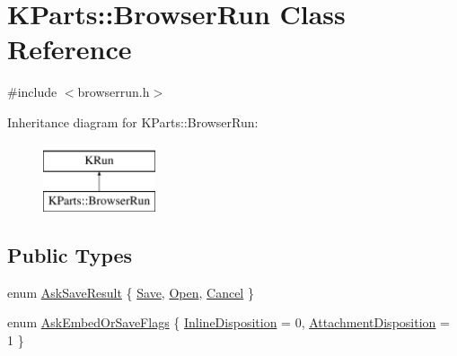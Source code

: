 \hypertarget{classKParts_1_1BrowserRun}{\section{K\+Parts\+:\+:Browser\+Run Class Reference}
\label{classKParts_1_1BrowserRun}
}


{\ttfamily \#include $<$browserrun.\+h$>$}

Inheritance diagram for K\+Parts\+:\+:Browser\+Run\+:\begin{figure}[H]
\begin{center}
\leavevmode
\includegraphics[height=2.000000cm]{classKParts_1_1BrowserRun}
\end{center}
\end{figure}
\subsection*{Public Types}
\begin{DoxyCompactItemize}
\item 
enum \hyperlink{classKParts_1_1BrowserRun_a32ee53f65c723ec01f4c4c28e91db8e6}{Ask\+Save\+Result} \{ \hyperlink{classKParts_1_1BrowserRun_a32ee53f65c723ec01f4c4c28e91db8e6adc6aa058c60662f393aa8168681d8a58}{Save}, 
\hyperlink{classKParts_1_1BrowserRun_a32ee53f65c723ec01f4c4c28e91db8e6ac44e1cbf269e6df9367051c7561de90b}{Open}, 
\hyperlink{classKParts_1_1BrowserRun_a32ee53f65c723ec01f4c4c28e91db8e6aea88673d252dcf7b37559606ce45667f}{Cancel}
 \}
\item 
enum \hyperlink{classKParts_1_1BrowserRun_ae78b4e6186491175ccdb4b0f2693c08d}{Ask\+Embed\+Or\+Save\+Flags} \{ \hyperlink{classKParts_1_1BrowserRun_ae78b4e6186491175ccdb4b0f2693c08dafa80faaf171d25b4a0e095a2c1f51cfe}{Inline\+Disposition} = 0, 
\hyperlink{classKParts_1_1BrowserRun_ae78b4e6186491175ccdb4b0f2693c08daa236cc4b09fc3ca6f88d9a37b32ea8af}{Attachment\+Disposition} = 1
 \}
\end{DoxyCompactItemize}
